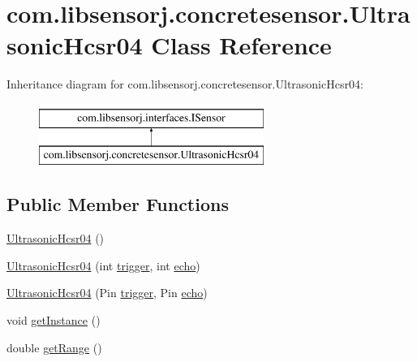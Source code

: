 \hypertarget{classcom_1_1libsensorj_1_1concretesensor_1_1UltrasonicHcsr04}{}\section{com.\+libsensorj.\+concretesensor.\+Ultrasonic\+Hcsr04 Class Reference}
\label{classcom_1_1libsensorj_1_1concretesensor_1_1UltrasonicHcsr04}
Inheritance diagram for com.\+libsensorj.\+concretesensor.\+Ultrasonic\+Hcsr04\+:\begin{figure}[H]
\begin{center}
\leavevmode
\includegraphics[height=2.000000cm]{classcom_1_1libsensorj_1_1concretesensor_1_1UltrasonicHcsr04}
\end{center}
\end{figure}
\subsection*{Public Member Functions}
\begin{DoxyCompactItemize}
\item 
\hyperlink{classcom_1_1libsensorj_1_1concretesensor_1_1UltrasonicHcsr04_a7e02068d9acb1b3cf1d15d45afbf377b}{Ultrasonic\+Hcsr04} ()
\item 
\hyperlink{classcom_1_1libsensorj_1_1concretesensor_1_1UltrasonicHcsr04_a14e708bf4eb89a2ceb0037fcb837522c}{Ultrasonic\+Hcsr04} (int \hyperlink{classcom_1_1libsensorj_1_1concretesensor_1_1UltrasonicHcsr04_a13705a8251de22d0f52caa3e17d23376}{trigger}, int \hyperlink{classcom_1_1libsensorj_1_1concretesensor_1_1UltrasonicHcsr04_a3695a560e3157a5e6f7896532d717456}{echo})
\item 
\hyperlink{classcom_1_1libsensorj_1_1concretesensor_1_1UltrasonicHcsr04_ae00a91eaf7e5c08695c50a670698ed5f}{Ultrasonic\+Hcsr04} (Pin \hyperlink{classcom_1_1libsensorj_1_1concretesensor_1_1UltrasonicHcsr04_a13705a8251de22d0f52caa3e17d23376}{trigger}, Pin \hyperlink{classcom_1_1libsensorj_1_1concretesensor_1_1UltrasonicHcsr04_a3695a560e3157a5e6f7896532d717456}{echo})
\item 
void \hyperlink{classcom_1_1libsensorj_1_1concretesensor_1_1UltrasonicHcsr04_a170167614b330d79518647a9a9722b62}{get\+Instance} ()
\item 
double \hyperlink{classcom_1_1libsensorj_1_1concretesensor_1_1UltrasonicHcsr04_aec68f4aadd8faa618025dfa37c89c696}{get\+Range} ()
\end{DoxyCompactItemize}
